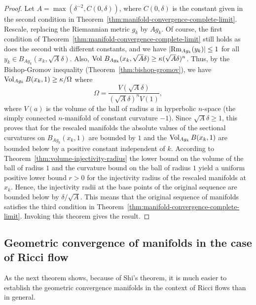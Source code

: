 \begin{proof}
\sketch
{}
Let $A=\max(\delta^{-2},C(0,\delta))$, where $C(0,\delta)$ is the constant
given in the second condition in Theorem~\ref{thm:manifold-convergence-complete-limit}. Rescale, replacing the
Riemannian metric $g_k$ by $Ag_k$. Of course, the first condition of
Theorem~\ref{thm:manifold-convergence-complete-limit} still holds as does the second with different constants,
and we have $\left|\operatorname{Rm}_{Ag_k}(y_k)\right|\le 1$ for all $y_k\in
B_{Ag_k}(x_k,\sqrt{A}\delta)$. Also, $\operatorname{Vol}\,B_{Ag_k}(x_k,\sqrt{A}\delta)\ge \kappa (\sqrt{A}\delta)^n$. Thus, by the
Bishop-Gromov inequality (Theorem~\ref{thm:bishop-gromov}), we have $\operatorname{Vol}_{Ag_k}B(x_k,1)\ge \kappa/\Omega$ where
$$\Omega=\frac{V(\sqrt{A}\delta)}{(\sqrt{A}\delta)^nV(1)},$$
where $V(a)$ is the volume of the ball of radius $a$ in hyperbolic
$n$-space (the simply connected $n$-manifold of constant curvature
$-1$).
 Since
$\sqrt{A}\delta\ge 1$, this proves that for the rescaled manifolds the absolute
values of the sectional curvatures on $B_{Ag_k}(x_k,1)$ are bounded by $1$ and
the $\operatorname{Vol}_{Ag_k}B(x_k,1)$ are bounded below by a positive constant
independent of $k$.
 According to Theorem~\ref{thm:volume-injectivity-radius} the lower bound on the volume of the ball
of radius $1$ and the curvature bound on the ball of radius $1$ yield a uniform
positive lower bound $r>0$ for the injectivity radius of the rescaled manifolds
at $x_k$. Hence, the injectivity radii at the base points of the original
sequence are bounded below by $\delta/\sqrt{A}$. This means that the original
sequence of manifolds satisfies the third condition in Theorem~\ref{thm:manifold-convergence-complete-limit}.
Invoking this theorem gives the result.
\end{proof}


\subsection{Geometric convergence of manifolds in the case of Ricci
flow}

As the next theorem shows, because of Shi's theorem, it is much
easier to establish the geometric convergence manifolds in the
context of Ricci flows than in general.





